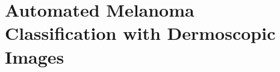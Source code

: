 \acresetall
\chapter{Automated Melanoma Classification with Dermoscopic Images}
\label{chp:chapter3}






%



